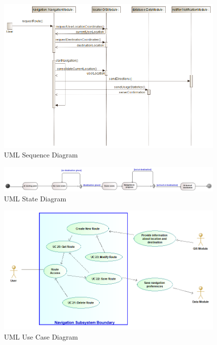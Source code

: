 	\begin{figure}
	  \includegraphics[width=\linewidth]{NavigationModuleSequenceDiagram.png}
	  \caption{UML Sequence Diagram}
	  \label{fig:UML5}
	\end{figure}
	
	\begin{figure}
	  \includegraphics[width=\linewidth]{NavigationModuleStateDiagram.png}
	  \caption{UML State Diagram}
	  \label{fig:UML3}
	\end{figure}
	
	\begin{figure}
	  \includegraphics[width=\linewidth]{NavigationModuleUseCaseDiagram.png}
	  \caption{UML Use Case Diagram}
	  \label{fig:UML4}
	\end{figure}
	
	


	
	
	

